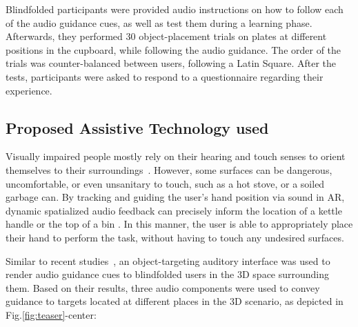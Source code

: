 \documentclass{vgtc}                          %
\begin{document}
Blindfolded participants were provided audio instructions on how to follow each of the audio guidance cues, as well as test them during a learning phase. Afterwards, they performed 30 object-placement trials on plates at different positions in the cupboard, while following the audio guidance. The order of the trials was counter-balanced between users, following a Latin Square. After the tests, participants were asked to respond to a questionnaire regarding their experience.

\subsection{Proposed Assistive Technology used}

Visually impaired people mostly rely on their hearing and touch senses to orient themselves to their surroundings~\cite{lighthouse:2015}. However, some surfaces can be dangerous, uncomfortable, or even unsanitary to touch, such as a hot stove, or a soiled garbage can. By tracking and guiding the user's hand position via sound in AR, dynamic spatialized audio feedback can precisely inform the location of a kettle handle or the top of a bin \cite{guarese:2022}. In this manner, the user is able to appropriately place their hand to perform the task, without having to touch any undesired surfaces. 

Similar to recent studies~\cite{May:2019, guarese:2021, barde:2020, pare:2021}, an object-targeting auditory interface was used to render audio guidance cues to blindfolded users in the 3D space surrounding them. Based on their results, three audio components were used to convey guidance to targets located at different places in the 3D scenario, as depicted in Fig.\ref{fig:teaser}-center:
\end{document}
